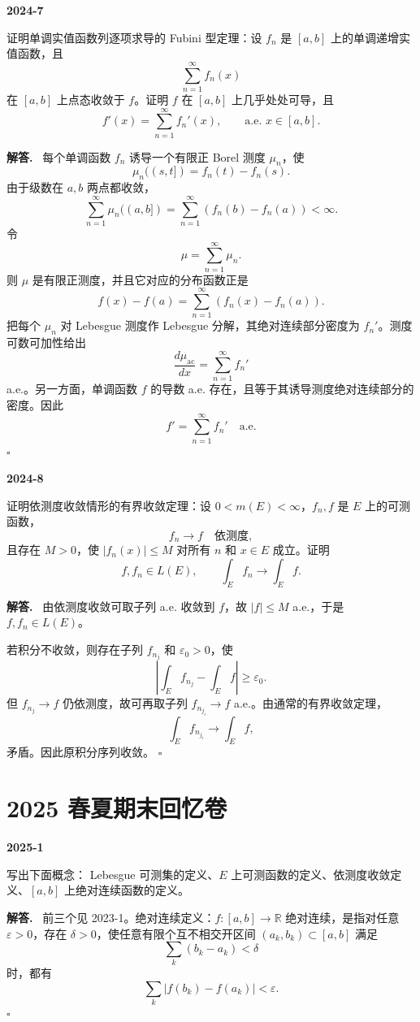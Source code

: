 \documentclass[UTF8]{ctexart}
\newcommand{\R}{\mathbb R}
\newcommand{\eps}{\varepsilon}
\newenvironment{problem}[1]{\par\medskip\noindent\textbf{#1}\par\smallskip}{\par}
\newenvironment{solution}{\par\noindent\textbf{解答.}\ }{\hfill$\square$\par\medskip}
\begin{document}
\begin{problem}{2024-7}
证明单调实值函数列逐项求导的 Fubini 型定理：设 \(f_n\) 是 \([a,b]\) 上的单调递增实值函数，且
\[
  \sum_{n=1}^\infty f_n(x)
\]
在 \([a,b]\) 上点态收敛于 \(f\)。证明 \(f\) 在 \([a,b]\) 上几乎处处可导，且
\[
  f'(x)=\sum_{n=1}^\infty f_n'(x),\qquad \text{a.e. }x\in[a,b].
\]
\end{problem}
\begin{solution}
每个单调函数 \(f_n\) 诱导一个有限正 Borel 测度 \(\mu_n\)，使
\[
  \mu_n((s,t])=f_n(t)-f_n(s).
\]
由于级数在 \(a,b\) 两点都收敛，
\[
  \sum_{n=1}^\infty \mu_n((a,b])=\sum_{n=1}^\infty (f_n(b)-f_n(a))<\infty.
\]
令
\[
  \mu=\sum_{n=1}^\infty \mu_n.
\]
则 \(\mu\) 是有限正测度，并且它对应的分布函数正是
\[
  f(x)-f(a)=\sum_{n=1}^\infty (f_n(x)-f_n(a)).
\]
把每个 \(\mu_n\) 对 Lebesgue 测度作 Lebesgue 分解，其绝对连续部分密度为 \(f_n'\)。测度可数可加性给出
\[
  \frac{d\mu_{\mathrm{ac}}}{dx}=\sum_{n=1}^\infty f_n'
\]
a.e.。另一方面，单调函数 \(f\) 的导数 a.e. 存在，且等于其诱导测度绝对连续部分的密度。因此
\[
  f'=\sum_{n=1}^\infty f_n'\quad \text{a.e.}
\]
\end{solution}

\begin{problem}{2024-8}
证明依测度收敛情形的有界收敛定理：设 \(0<m(E)<\infty\)，\(f_n,f\) 是 \(E\) 上的可测函数，
\[
  f_n\to f \quad\text{依测度},
\]
且存在 \(M>0\)，使 \(|f_n(x)|\le M\) 对所有 \(n\) 和 \(x\in E\) 成立。证明
\[
  f,f_n\in L(E),\qquad \int_E f_n\to\int_E f.
\]
\end{problem}
\begin{solution}
由依测度收敛可取子列 a.e. 收敛到 \(f\)，故 \(|f|\le M\) a.e.，于是 \(f,f_n\in L(E)\)。

若积分不收敛，则存在子列 \(f_{n_j}\) 和 \(\eps_0>0\)，使
\[
  \left|\int_E f_{n_j}-\int_E f\right|\ge\eps_0.
\]
但 \(f_{n_j}\to f\) 仍依测度，故可再取子列 \(f_{n_{j_i}}\to f\) a.e.。由通常的有界收敛定理，
\[
  \int_E f_{n_{j_i}}\to\int_E f,
\]
矛盾。因此原积分序列收敛。
\end{solution}

\section{2025 春夏期末回忆卷}

\begin{problem}{2025-1}
写出下面概念：
Lebesgue 可测集的定义、\(E\) 上可测函数的定义、依测度收敛定义、\([a,b]\) 上绝对连续函数的定义。
\end{problem}
\begin{solution}
前三个见 2023-1。绝对连续定义：\(f:[a,b]\to\R\) 绝对连续，是指对任意
\(\eps>0\)，存在 \(\delta>0\)，使任意有限个互不相交开区间
\((a_k,b_k)\subset[a,b]\) 满足
\[
  \sum_k(b_k-a_k)<\delta
\]
时，都有
\[
  \sum_k |f(b_k)-f(a_k)|<\eps.
\]
\end{solution}
\end{document}
